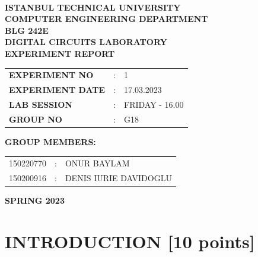 \documentclass[pdftex,12pt,a4paper]{article}
\begin{document}
\begin{titlepage}
\begin{center}
\textbf{}\\
\textbf{\Large{ISTANBUL TECHNICAL UNIVERSITY}}\\
\vspace{0.5cm}
\textbf{\Large{COMPUTER ENGINEERING DEPARTMENT}}\\
\vspace{2cm}
\textbf{\Large{BLG 242E\\ DIGITAL CIRCUITS LABORATORY\\ EXPERIMENT REPORT}}\\
\vspace{2.8cm}
\begin{table}[ht]
\centering
\Large{
\begin{tabular}{lcl}
\textbf{EXPERIMENT NO}  & : & 1 \\
\textbf{EXPERIMENT DATE}  & : & 17.03.2023 \\
\textbf{LAB SESSION}  & : & FRIDAY - 16.00 \\
\textbf{GROUP NO}  & : & G18 \\
\end{tabular}}
\end{table}
\vspace{1cm}
\textbf{\Large{GROUP MEMBERS:}}\\
\begin{table}[ht]
\centering
\Large{
\begin{tabular}{rcl}
150220770  & : & ONUR BAYLAM \\
150200916  & : & DENIS IURIE DAVIDOGLU \\
\end{tabular}}
\end{table}
\vspace{2.8cm}
\textbf{\Large{SPRING 2023}}

\end{center}

\end{titlepage}

\thispagestyle{empty}
\setcounter{tocdepth}{4}
\tableofcontents
\clearpage

\setcounter{page}{1}

\section{INTRODUCTION [10 points]}
\end{document}
